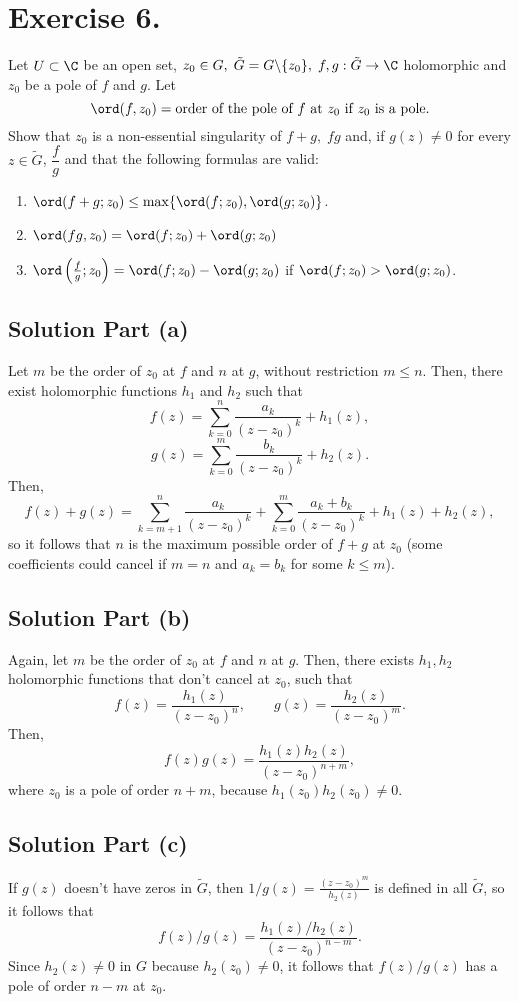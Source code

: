 
\section*{Exercise 6.}

Let $U \subset \C$ be an open set, $z_0 \in G,\; \tilde{G} = G\backslash \{z_0\},\; f,g: \tilde{G} \to \C$ holomorphic and $z_0$ be a pole of $f$ and $g$. Let
\[ \ord(f,z_0) = \mbox{order of the pole of $f$ at $z_0$ if $z_0$ is a pole}. \]
Show that $z_0$ is a non-essential singularity of $f+g,\; fg$ and, if $g(z) \neq 0$ for every $z \in \tilde{G}$, $\dfrac{f}{g}$ and that the following formulas are valid:
\begin{enumerate}[label = (\alph*)]
    \item $\ord(f+g;z_0) \leq \max\{\ord(f;z_0), \ord(g;z_0)\}$.
    \item $\ord(fg,z_0) = \ord(f;z_0)+\ord(g;z_0)$
    \item $\ord\left( \frac{f}{g}; z_0 \right) = \ord(f;z_0) - \ord(g;z_0)$ if $\ord(f;z_0) > \ord(g;z_0)$.
\end{enumerate}

\subsection*{Solution Part (a)}

Let $m$ be the order of $z_0$ at $f$ and $n$ at $g$, without restriction $m \leq n$. Then, there exist holomorphic functions $h_1$ and $h_2$ such that
\[ f(z) = \sum_{k = 0}^{n} \frac{a_k}{(z-z_0)^k} + h_1(z), \]
\[ g(z) = \sum_{k = 0}^{m} \frac{b_k}{(z-z_0)^k} + h_2(z). \]
Then,
\[ f(z)+g(z) = \sum_{k = m+1}^{n} \frac{a_k}{(z-z_0)^k} + \sum_{k = 0}^{m}\frac{a_k + b_k}{(z-z_0)^k} + h_1(z) + h_2(z), \]
so it follows that $n$ is the maximum possible order of $f+g$ at $z_0$ (some coefficients could cancel if $m = n$ and $a_k = b_k$ for some $k\leq m$).


\subsection*{Solution Part (b)}

Again, let $m$ be the order of $z_0$ at $f$ and $n$ at $g$. Then, there exists $h_1, h_2$ holomorphic functions that don't cancel at $z_0$, such that
\[ f(z) = \frac{h_1(z)}{(z-z_0)^n},\hspace{2em}  g(z) = \frac{h_2(z)}{(z-z_0)^m}. \]
Then,
\[ f(z)g(z) = \frac{h_1(z)h_2(z)}{(z-z_0)^{n+m}}, \]
where $z_0$ is a pole of order $n+m$, because $h_1(z_0)h_2(z_0) \neq 0$.

\subsection*{Solution Part (c)}

If $g(z)$ doesn't have zeros in $\tilde{G}$, then $1/g(z) = \frac{(z-z_0)^m}{h_2(z)}$ is defined in all $\tilde{G}$, so it follows that
\[ f(z)/g(z) = \frac{h_1(z)/h_2(z)}{(z-z_0)^{n-m}}. \]
Since $h_2(z) \neq 0$ in $G$ because $h_2(z_0) \neq 0$, it follows that $f(z)/g(z)$ has a pole of order $n-m$ at $z_0$.